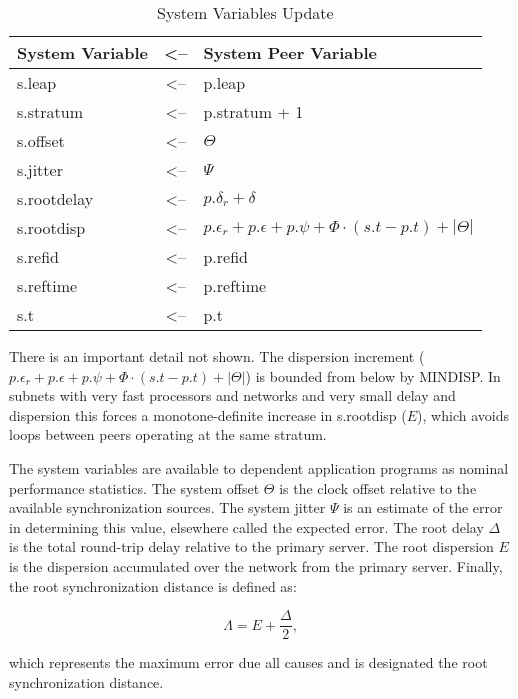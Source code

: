 \begin{table}[htb]
\center
\begin{tabular}{| l | c | l |}
\hline
System Variable & <-- & System Peer Variable \\
\hline
\hline
s.leap      & <-- & p.leap                    \\
s.stratum   & <-- & p.stratum + 1             \\
s.offset    & <-- & $ \Theta $                     \\
s.jitter    & <-- & $ \Psi $                       \\
s.rootdelay & <-- & $ p.\delta_r + \delta $         \\
s.rootdisp  & <-- & $ p.\epsilon_r + p.\epsilon + p.\psi + \Phi \cdot (s.t - p.t) + |\Theta| $ \\
s.refid     & <-- & p.refid                   \\
s.reftime   & <-- & p.reftime                 \\
s.t         & <-- & p.t                       \\
\hline
\end{tabular}
\caption{System Variables Update}
\label{system_variables_update}
\end{table}

There is an important detail not shown.  The dispersion increment
($ p.\epsilon_r + p.\epsilon + p.\psi + \Phi \cdot (s.t - p.t) + |\Theta| $) is bounded from
below by MINDISP.  In subnets with very fast processors and networks
and very small delay and dispersion this forces a monotone-definite
increase in s.rootdisp ($ E $), which avoids loops between peers
operating at the same stratum.

The system variables are available to dependent application programs
as nominal performance statistics.  The system offset $ \Theta $ is the
clock offset relative to the available synchronization sources.  The
system jitter $ \Psi $ is an estimate of the error in determining this
value, elsewhere called the expected error.  The root delay $ \Delta $ is
the total round-trip delay relative to the primary server.  The root
dispersion $ E $ is the dispersion accumulated over the network
from the primary server.  Finally, the root synchronization distance
is defined as:

$$
\Lambda = E + \frac{\Delta}{2},
$$

which represents the maximum error due all causes and is designated
the root synchronization distance.

